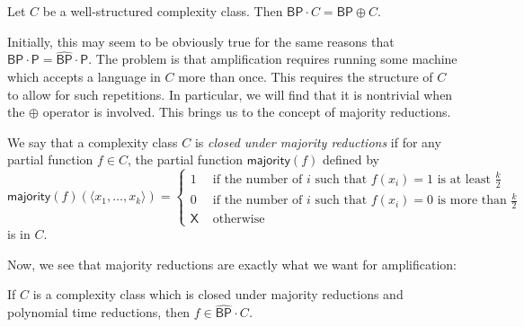 \documentclass[11pt]{article}
\newcommand{\bp}{\textsf{BP}}
\newcommand{\strongbp}{\widehat{\textsf{BP}}}
\newcommand{\parity}{\oplus}
\newcommand{\p}{\textsf{P}}
\newcommand{\x}{\textsf{X}}
\newcommand{\majority}{\textsf{majority}}
\begin{document}
\begin{theorem}\label{amplify}
Let $C$ be a well-structured complexity class. Then \emph{$\bp \cdot C = \bp \parity C$}.
\end{theorem}

Initially, this may seem to be obviously true for the same reasons that $\bp \cdot \p = \strongbp \cdot \p$. The problem is that amplification requires running some machine which accepts a language in $C$ more than once. This requires the structure of $C$ to allow for such repetitions. In particular, we will find that it is nontrivial when the $\parity$ operator is involved. This brings us to the concept of majority reductions.
\begin{definition}\label{defmajority}
We say that a complexity class $C$ is \emph{closed under majority reductions} if for any partial function $f \in C$, the partial function $\majority(f)$ defined by
$$\majority(f)(\langle x_1, \ldots, x_k\rangle) = 
\begin{cases}1 & \text{ if the number of $i$ such that }f(x_i) = 1\text{ is at least $\frac{k}{2}$} \\
0 & \text{ if the number of $i$ such that }f(x_i) = 0\text{ is more than $\frac{k}{2}$}\\
\x & \text{ otherwise}
\end{cases}$$
is in $C$.
\end{definition}
Now, we see that majority reductions are exactly what we want for amplification:
\begin{lemma}\label{majorityimpliesamplify}
If $C$ is a complexity class which is closed under majority reductions and polynomial time reductions, then \emph{$f\in\strongbp \cdot C$.}
\end{lemma}
\end{document}
